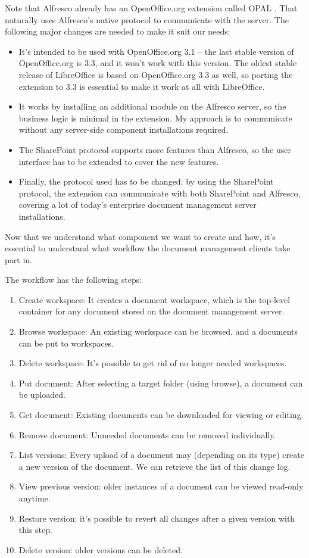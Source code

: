 Note that Alfresco already has an OpenOffice.org extension called
OPAL \cite{opal}. That naturally uses Alfresco's native protocol to communicate
with the server. The following major changes are needed to make it suit our
needs:

\begin{itemize}
\item It's intended to be used with OpenOffice.org 3.1 -- the last stable
version of OpenOffice.org is 3.3, and it won't work with this version. The
oldest stable release of LibreOffice is based on OpenOffice.org 3.3 as well, so
porting the extension to 3.3 is essential to make it work at all with
LibreOffice.
\item It works by installing an additional module on the Alfresco server, so
the business logic is minimal in the extension. My approach is to communicate
without any server-side component installations required.
\item The SharePoint protocol supports more features than Alfresco, so the user 
interface has to be extended to cover the new features.
\item Finally, the protocol used has to be changed: by using the SharePoint
protocol, the extension can communicate with both SharePoint and Alfresco,
covering a lot of today's enterprise document management server
installations.
\end{itemize}

Now that we understand what component we want to create and how, it's
essential to understand what workflow the document management clients take part
in.

The workflow has the following steps:

\begin{enumerate}
\item Create workspace: It creates a document workspace, which is the top-level
container for any document stored on the document management server.
\item Browse workspace: An existing workspace can be browsed, and a documents
can be put to workspaces.
\item Delete workspace: It's possible to get rid of no longer needed workspaces.
\item Put document: After selecting a target folder (using browse), a document
can be uploaded.
\item Get document: Existing documents can be downloaded for viewing or editing.
\item Remove document: Unneeded documents can be removed individually.
\item List versions: Every upload of a document may (depending on its type)
create a new version of the document. We can retrieve the list of this change log.
\item View previous version: older instances of a document can be viewed
read-only anytime.
\item Restore version: it's possible to revert all changes after a given
version with this step.
\item Delete version: older versions can be deleted.
\end{enumerate}

